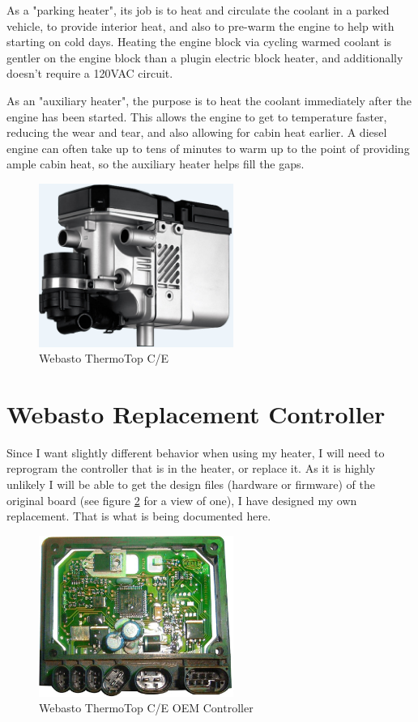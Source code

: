 \documentclass[lettersize,journal]{IEEEtran}
\begin{document}
As a "parking heater", its job is to heat and circulate the coolant in a parked vehicle, to provide interior heat, and also to pre-warm the engine to help with starting on cold days.  Heating the engine block via cycling warmed coolant is gentler on the engine block than a plugin electric block heater, and additionally doesn't require a 120VAC circuit.

As an "auxiliary heater", the purpose is to heat the coolant immediately after the engine has been started.  This allows the engine to get to temperature faster, reducing the wear and tear, and also allowing for cabin heat earlier.  A diesel engine can often take up to tens of minutes to warm up to the point of providing ample cabin heat, so the auxiliary heater helps fill the gaps.

\begin{figure}[!t]
\centering
\includegraphics[width=2.5in,keepaspectratio]{Thermo-Top-C-E.png}
\caption{Webasto ThermoTop C/E}
\label{webasto-stock}
\end{figure}


\section{Webasto Replacement Controller}

\noindent Since I want slightly different behavior when using my heater, I will need to reprogram the controller that is in the heater, or replace it.  As it is highly unlikely I will be able to get the design files (hardware or firmware) of the original board (see figure \ref{controller-orig} for a view of one), I have designed my own replacement.  That is what is being documented here.

\begin{figure}[!t]
\centering
\includegraphics[width=2.5in,keepaspectratio]{mainboard-orig.png}
\caption{Webasto ThermoTop C/E OEM Controller}
\label{controller-orig}
\end{figure}
\end{document}
